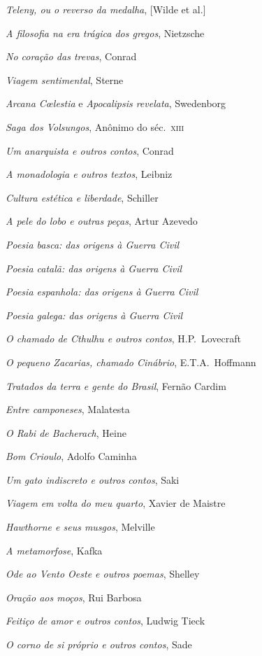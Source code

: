 \begin{enumerate}
{\item \textit{Teleny, ou o reverso da medalha}, [Wilde et al.]
\item \textit{A filosofia na era trágica dos gregos}, Nietzsche
\item \textit{No coração das trevas}, Conrad
\item \textit{Viagem sentimental}, Sterne
\item \textit{Arcana C\oe lestia} e \textit{Apocalipsis revelata}, Swedenborg
\item \textit{Saga dos Volsungos}, Anônimo do séc.~\textsc{xiii}
\item \textit{Um anarquista e outros contos}, Conrad
\item \textit{A monadologia e outros textos}, Leibniz
\item \textit{Cultura estética e liberdade}, Schiller
\item \textit{A pele do lobo e outras peças}, Artur Azevedo
\item \textit{Poesia basca: das origens à Guerra Civil} 
\item \textit{Poesia catalã: das origens à Guerra Civil} 
\item \textit{Poesia espanhola: das origens à Guerra Civil} 
\item \textit{Poesia galega: das origens à Guerra Civil} 
\item \textit{O chamado de Cthulhu e outros contos}, H.P.~Lovecraft 
\item \textit{O pequeno Zacarias, chamado Cinábrio}, E.T.A.~Hoffmann
\item \textit{Tratados da terra e gente do Brasil}, Fernão Cardim 
\item \textit{Entre camponeses}, Malatesta
\item \textit{O Rabi de Bacherach}, Heine
\item \textit{Bom Crioulo}, Adolfo Caminha
\item \textit{Um gato indiscreto e outros contos}, Saki
\item \textit{Viagem em volta do meu quarto}, Xavier de Maistre 
\item \textit{Hawthorne e seus musgos}, Melville
\item \textit{A metamorfose}, Kafka
\item \textit{Ode ao Vento Oeste e outros poemas}, Shelley
\item \textit{Oração aos moços}, Rui Barbosa
\item \textit{Feitiço de amor e outros contos}, Ludwig Tieck
\item \textit{O corno de si próprio e outros contos}, Sade
}
\end{enumerate}
